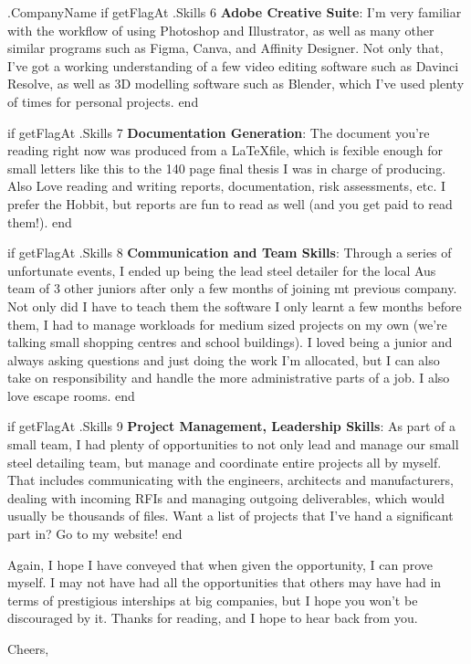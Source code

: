 \documentclass[10pt]{letter}
\begin{document}
\begin{letter}{
    {{ .CompanyName }}
}
{{ if getFlagAt .Skills 6 }}
\textbf{Adobe Creative Suite}: I'm very familiar with the workflow of using Photoshop and Illustrator, as well as many other similar programs such as Figma, Canva, and Affinity Designer. Not only that, I've got a working understanding of a few video editing software such as Davinci Resolve, as well as 3D modelling software such as Blender, which I've used plenty of times for personal projects. 
{{ end }}

{{ if getFlagAt .Skills 7 }}
\textbf{Documentation Generation}: The document you're reading right now was produced from a \LaTeX file, which is fexible enough for small letters like this to the 140 page final thesis I was in charge of producing. Also Love reading and writing reports, documentation, risk assessments, etc. I prefer the Hobbit, but reports are fun to read as well (and you get paid to read them!). 
{{ end }}

{{ if getFlagAt .Skills 8 }}
\textbf{Communication and Team Skills}: Through a series of unfortunate events, I ended up being the lead steel detailer for the local Aus team of 3 other juniors after only a few months of joining mt previous company. Not only did I have to teach them the software I only learnt a few months before them, I had to manage workloads for medium sized projects on my own (we're talking small shopping centres and school buildings). I loved being a junior and always asking questions and just doing the work I'm allocated, but I can also take on responsibility and handle the more administrative parts of a job. I also love escape rooms. 
{{ end }}

{{ if getFlagAt .Skills 9 }}
\textbf{Project Management, Leadership Skills}: As part of a small team, I had plenty of opportunities to not only lead and manage our small steel detailing team, but manage and coordinate entire projects all by myself. That includes communicating with the engineers, architects and manufacturers, dealing with incoming RFIs and managing outgoing deliverables, which would usually be thousands of files. Want a list of projects that I've hand a significant part in? Go to my website!
{{ end }}

Again, I hope I have conveyed that when given the opportunity, I can prove myself. I may not have had all the opportunities that others may have had in terms of prestigious interships at big companies, but I hope you won't be discouraged by it. Thanks for reading, and I hope to hear back from you. 


\closing{Cheers,}

\end{letter}
\end{document}
